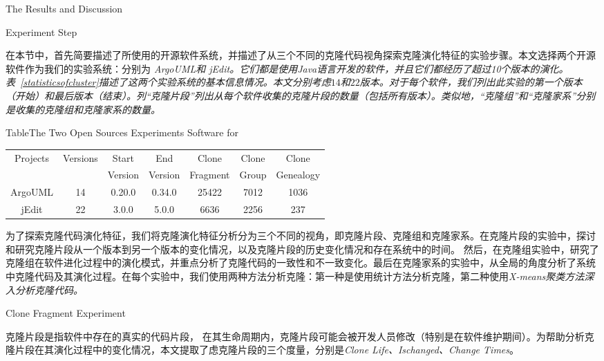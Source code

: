 {The Results and Discussion}

{Experiment Step}

在本节中，首先简要描述了所使用的开源软件系统，并描述了从三个不同的克隆代码视角探索克隆演化特征的实验步骤。本文选择两个开源软件作为我们的实验系统：分别为\em{ ArgoUML}和\em{  jEdit}。它们都是使用Java语言开发的软件，并且它们都经历了超过10个版本的演化。%
表~\ref{statisticsofcluster}描述了这两个实验系统的基本信息情况。本文分别考虑$14 $和$22$版本。对于每个软件，我们列出此实验的第一个版本（开始）和最后版本（结束）。列“克隆片段”列出从每个软件收集的克隆片段的数量（包括所有版本）。类似地，“克隆组”和“克隆家系”分别是收集的克隆组和克隆家系的数量。

\begin{table}[htbp]
{Table$\!$}{The Two Open Sources Experiments Software for }
\vspace{0.5em}
\centering 
\wuhao
\begin{tabular}{ccccccc}
\toprule[1.5pt ]
\multirow{2}{*}{Projects}&\multirow{2}{*}{Versions}&Start&End&Clone&Clone&Clone\\ 
&&Version&Version&Fragment&Group&Genealogy\\
\midrule[1pt]
ArgoUML&14&0.20.0&0.34.0&25422&7012&1036\\ 
jEdit&22&3.0.0&5.0.0&6636&2256	&237\\ 
\bottomrule[1.5pt]
\end{tabular}
\end{table}

为了探索克隆代码演化特征，我们将克隆演化特征分析分为三个不同的视角，即克隆片段、克隆组和克隆家系。在克隆片段的实验中，探讨和研究克隆片段从一个版本到另一个版本的变化情况，以及克隆片段的历史变化情况和存在系统中的时间。 然后，在克隆组实验中，研究了克隆组在软件进化过程中的演化模式，并重点分析了克隆代码的一致性和不一致变化。最后在克隆家系的实验中，从全局的角度分析了系统中克隆代码及其演化过程。在每个实验中，我们使用两种方法分析克隆：第一种是使用统计方法分析克隆，第二种使用\em{X-means}聚类方法深入分析克隆代码。

{Clone Fragment Experiment}

克隆片段是指软件中存在的真实的代码片段， 在其生命周期内，克隆片段可能会被开发人员修改（特别是在软件维护期间）。为帮助分析克隆片段在其演化过程中的变化情况，本文提取了虑克隆片段的三个度量，分别是{\em Clone Life、Ischanged、Change Times}。 

